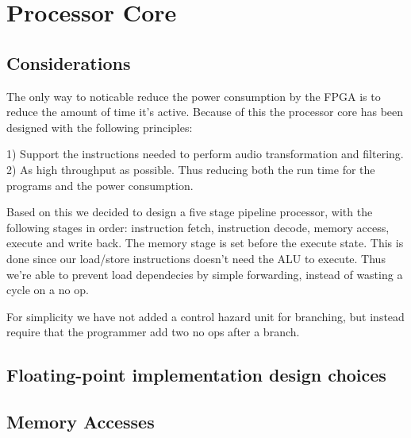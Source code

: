 \FloatBarrier
\section{Processor Core}\label{section:fpga-processor-core}

\subsection{Considerations}

The only way to noticable reduce the power consumption by the FPGA is to reduce the amount of time it's active. Because of this the processor core has been designed with the following principles:

1) Support the instructions needed to perform audio transformation and filtering.
2) As high throughput as possible. Thus reducing both the run time for the programs and the power consumption. 

Based on this we decided to design a five stage pipeline processor, with the following stages in order: instruction fetch, instruction decode, memory access, execute and write back. The memory stage is set before the execute state. This is done since our load/store instructions doesn't need the ALU to execute. Thus we're able to prevent load dependecies by simple forwarding, instead of wasting a cycle on a no op. 

For simplicity we have not added a control hazard unit for branching, but instead require that the programmer add two no ops after a branch.  


\subsection{Floating-point implementation design choices}

\subsection{Memory Accesses}

